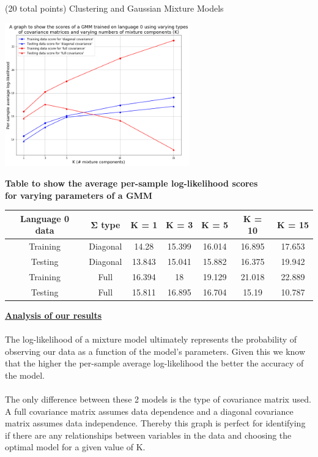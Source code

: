 \documentclass[12pt]{article}
\begin{document}
\begin{question}{(20 total points) Clustering and Gaussian Mixture Models}
\begin{subquestion}
      \begin{answerbox}{30em}
        \scriptsize{
        \begin{center}
        \includegraphics[width=0.6\textwidth]{images/q35.png}
        \end{center}
        \begin{center}
        \textbf{Table to show the average per-sample log-likelihood scores} \\
        \textbf{for varying parameters of a GMM} \\
        \vspace{0.3cm}
        \begin{tabular}{ |c|c|c|c|c|c|c| } \hline
        \textbf{Language 0 data} & \textbf{$\mathbf{\Sigma}$ type} & \textbf{K = 1} & \textbf{K = 3} & \textbf{K = 5} & \textbf{K = 10} & \textbf{K = 15} \\ \hline
        Training & Diagonal & 14.28 & 15.399 & 16.014 & 16.895 & 17.653 \\
        Testing & Diagonal & 13.843 & 15.041 & 15.882 & 16.375 & 19.942 \\
        Training & Full & 16.394 & 18 & 19.129 & 21.018 & 22.889 \\
        Testing & Full & 15.811 & 16.895 & 16.704 & 15.19 & 10.787 \\ \hline
        \end{tabular}
        \end{center}
        \textbf{\footnotesize{\underline{Analysis of our results}}}\\
\\
        The log-likelihood of a mixture model ultimately represents the probability of observing our data as a function of the model's parameters. Given this we know that the higher the per-sample average log-likelihood the better the accuracy of the model.\\
\\
        The only difference between these 2 models is the type of covariance matrix used. A full covariance matrix assumes data dependence and a diagonal covariance matrix assumes data independence. Thereby this graph is perfect for identifying if there are any relationships between variables in the data and choosing the optimal model for a given value of K.\\
}
\end{answerbox}
\end{subquestion}
\end{question}
\end{document}
